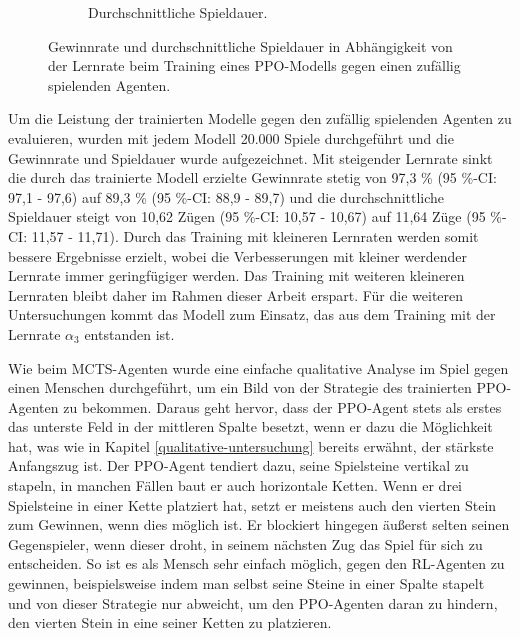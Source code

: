 \begin{figure}[ht!]
\begin{subfigure}[b]{0.48\textwidth}
		\caption{Durchschnittliche Spieldauer.}
		\label{fig:f22}
	\end{subfigure}
	\caption{Gewinnrate und durchschnittliche Spieldauer in Abhängigkeit von der Lernrate beim Training eines PPO-Modells gegen einen zufällig spielenden Agenten.}
\end{figure}

Um die Leistung der trainierten Modelle gegen den zufällig spielenden Agenten zu evaluieren, wurden mit jedem Modell 20.000 Spiele durchgeführt und die Gewinnrate und Spieldauer wurde aufgezeichnet. Mit steigender Lernrate sinkt die durch das trainierte Modell erzielte Gewinnrate stetig von 97,3 \% (95 \%-CI: 97,1 - 97,6) auf 89,3 \% (95 \%-CI: 88,9 - 89,7) und die durchschnittliche Spieldauer steigt von 10,62 Zügen (95 \%-CI: 10,57 - 10,67) auf 11,64 Züge (95 \%-CI: 11,57 - 11,71). Durch das Training mit kleineren Lernraten werden somit bessere Ergebnisse erzielt, wobei die Verbesserungen mit kleiner werdender Lernrate immer geringfügiger werden. Das Training mit weiteren kleineren Lernraten bleibt daher im Rahmen dieser Arbeit erspart. Für die weiteren Untersuchungen kommt das Modell zum Einsatz, das aus dem Training mit der Lernrate $\alpha_3$ entstanden ist.

Wie beim MCTS-Agenten wurde eine einfache qualitative Analyse im Spiel gegen einen Menschen durchgeführt, um ein Bild von der Strategie des trainierten PPO-Agenten zu bekommen. Daraus geht hervor, dass der PPO-Agent stets als erstes das unterste Feld in der mittleren Spalte besetzt, wenn er dazu die Möglichkeit hat, was wie in Kapitel \ref{qualitative-untersuchung} bereits erwähnt, der stärkste Anfangszug ist. Der PPO-Agent tendiert dazu, seine Spielsteine vertikal zu stapeln, in manchen Fällen baut er auch horizontale Ketten. Wenn er drei Spielsteine in einer Kette platziert hat, setzt er meistens auch den vierten Stein zum Gewinnen, wenn dies möglich ist. Er blockiert hingegen äußerst selten seinen Gegenspieler, wenn dieser droht, in seinem nächsten Zug das Spiel für sich zu entscheiden. So ist es als Mensch sehr einfach möglich, gegen den RL-Agenten zu gewinnen, beispielsweise indem man selbst seine Steine in einer Spalte stapelt und von dieser Strategie nur abweicht, um den PPO-Agenten daran zu hindern, den vierten Stein in eine seiner Ketten zu platzieren.

